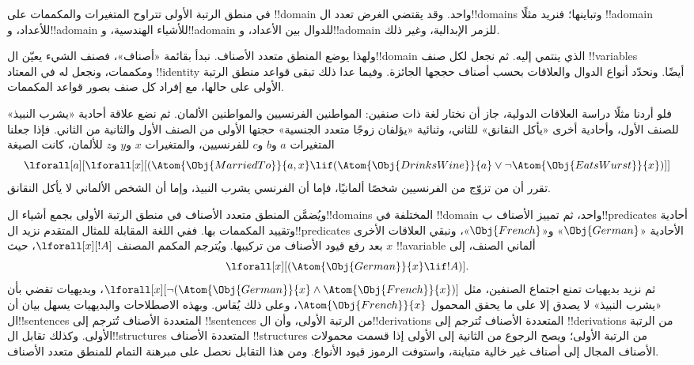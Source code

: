 \documentclass[../../../include/open-logic-section]{subfiles}
\begin{document}


في منطق الرتبة الأولى تتراوح المتغيرات والمكممات على !!{domain}
واحد. وقد يقتضي الغرض تعدد ال!!{domain}s وتباينها؛ فنريد مثلًا
!!a{domain} للأعداد، و!!a{domain} للأشياء الهندسية،
و!!a{domain} للدوال بين الأعداد، و!!a{domain} للزمر الإبدالية،
وغير ذلك.

ولهذا يوضع المنطق متعدد الأصناف. نبدأ بقائمة «أصناف»، فصنف
الشيء يعيّن ال!!{domain} الذي ينتمي إليه. ثم نجعل لكل صنف
!!{variable}s ومكممات، ونجعل له في المعتاد !!{identity} أيضًا.
ونحدّد أنواع الدوال والعلاقات بحسب أصناف حججها الجائزة.
وفيما عدا ذلك تبقى قواعد منطق الرتبة الأولى على حالها، مع
إفراد كل صنف بصور قواعد المكممات.

فلو أردنا مثلًا دراسة العلاقات الدولية، جاز أن نختار لغة ذات
صنفين: المواطنين الفرنسيين والمواطنين الألمان. ثم نضع علاقة
أحادية «يشرب النبيذ» للصنف الأول، وأحادية أخرى «يأكل النقانق»
للثاني، وثنائية «يؤلفان زوجًا متعدد الجنسية» حجتها الأولى من
الصنف الأول والثانية من الثاني. فإذا جعلنا المتغيرات $a$ و$b$
و$c$ للفرنسيين، والمتغيرات $x$ و$y$ و$z$ للألمان، كانت الصيغة
\[
\lforall[a][\lforall[x][(\Atom{\Obj{MarriedTo}}{a,x} \lif
(\Atom{\Obj{DrinksWine}}{a} \lor \lnot \Atom{\Obj{EatsWurst}}{x})]]
\]
تقرر أن من تزوّج من الفرنسيين شخصًا ألمانيًا، فإما أن الفرنسي
يشرب النبيذ، وإما أن الشخص الألماني لا يأكل النقانق.

ويُضمَّن المنطق متعدد الأصناف في منطق الرتبة الأولى بجمع أشياء
ال!!{domain}s المختلفة في !!{domain} واحد، ثم تمييز الأصناف
ب!!{predicate}s أحادية وتقييد المكممات بها. ففي اللغة المقابلة
للمثال المتقدم نزيد ال!!{predicate}s الأحادية
«$\Obj{German}$» و«$\Obj{French}$»، ونبقي العلاقات الأخرى
بعد رفع قيود الأصناف من تركيبها. ويُترجم المكمم المصنف
$\lforall[x][!A]$، حيث $x$ !!a{variable} ألماني الصنف، إلى
\[
\lforall[x][(\Atom{\Obj{German}}{x} \lif !A)].
\]
ثم نزيد بديهيات تمنع اجتماع الصنفين، مثل
$\lforall[x][\lnot (\Atom{\Obj{German}}{x} \land
  \Atom{\Obj{French}}{x})]$، وبديهيات تقضي بأن «يشرب النبيذ»
لا يصدق إلا على ما يحقق المحمول $\Atom{\Obj{French}}{x}$،
وعلى ذلك يُقاس. وبهذه الاصطلاحات والبديهيات يسهل بيان أن
ال!!{sentence}s المتعددة الأصناف تُترجم إلى !!{sentence}s من
الرتبة الأولى، وأن ال!!{derivation}s المتعددة الأصناف تُترجم إلى
!!{derivation}s من الرتبة الأولى. وكذلك تقابل ال!!{structure}s
المتعددة الأصناف !!{structure}s من الرتبة الأولى؛ ويصح الرجوع
من الثانية إلى الأولى إذا قسمت محمولات الأصناف المجال إلى
أصناف غير خالية متباينة، واستوفت الرموز قيود الأنواع.
ومن هذا التقابل نحصل على مبرهنة التمام للمنطق متعدد الأصناف.
\end{document}
